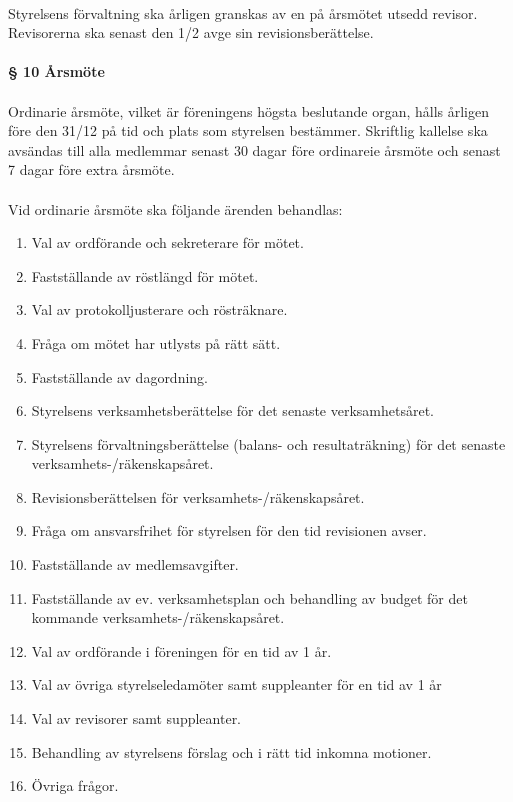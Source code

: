 \documentclass[12pt, a4paper]{article}
\begin{document}
\paragraph{}
Styrelsens förvaltning ska årligen granskas av en på årsmötet utsedd revisor. Revisorerna ska senast den 1/2 avge sin revisionsberättelse.

\paragraph{§ 10 Årsmöte}
\paragraph{}
Ordinarie årsmöte, vilket är föreningens högsta beslutande organ, hålls årligen före den 31/12 på tid och plats som styrelsen bestämmer.
Skriftlig kallelse ska avsändas till alla medlemmar senast 30 dagar före ordinareie årsmöte och senast 7 dagar före extra årsmöte.

\paragraph{}
Vid ordinarie årsmöte ska följande ärenden behandlas:
\begin{enumerate}
\item Val av ordförande och sekreterare för mötet.
\item Fastställande av röstlängd för mötet.
\item Val av protokolljusterare och rösträknare.
\item Fråga om mötet har utlysts på rätt sätt.
\item Fastställande av dagordning.
\item Styrelsens verksamhetsberättelse för det senaste verksamhetsåret.
\item Styrelsens förvaltningsberättelse (balans- och resultaträkning) för det senaste verksamhets-/räkenskapsåret.
\item Revisionsberättelsen för verksamhets-/räkenskapsåret.
\item Fråga om ansvarsfrihet för styrelsen för den tid revisionen avser.
\item Fastställande av medlemsavgifter.
\item Fastställande av ev. verksamhetsplan och behandling av budget för det kommande verksamhets-/räkenskapsåret.
\item Val av ordförande i föreningen för en tid av 1 år.
\item Val av övriga styrelseledamöter samt suppleanter för en tid av 1 år
\item Val av revisorer samt suppleanter.
\item Behandling av styrelsens förslag och i rätt tid inkomna motioner.
\item Övriga frågor. 
\end{enumerate}
\end{document}
